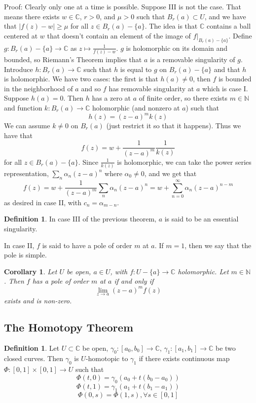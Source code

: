 \documentclass[11pt]{article}
\theoremstyle{plain}
\newtheorem{corollary}[theorem]{Corollary}
\theoremstyle{definition}
\newtheorem{definition}[theorem]{Definition}
\newcommand{\C}{\mathbb{C}}
\begin{document}
Proof: Clearly only one at a time is possible. Suppose III is not the case. That means there exists $w \in \C$, $r > 0$, and $\mu > 0$ such that $B_r(a) \subset U$, and we have that $|f(z)-w| \geq \mu$ for all $z \in B_r(a) - \{ a \}$. The idea is that $\C$ contains a ball centered at $w$ that doesn't contain an element of the image of $f|_{B_r(a) - \{ a\}}$. Define $g : B_r(a) - \{ a \} \to \C$ as $z \mapsto \frac{1}{f(z) - w}$. $g$ is holomorphic on its domain and bounded, so Riemann's Theorem implies that $a$ is a removable singularity of $g$. Introduce $h: B_r(a) \to \C$ such that $h$ is equal to $g$ on $B_r(a) - \{ a \}$ and that $h$ is holomorphic. We have two cases: the first is that $h(a) \neq  0$, then $f$ is bounded in the neighborhood of $a$ and so $f$ has removable singularity at $a$ which is case I. Suppose $h(a) = 0$. Then $h$ has a zero at $a$ of finite order, so there exists $m \in \mathbb{N}$ and function $k: B_r(a) \to \C$ holomorphic (and nonzero at $a$) such that 
$$ h(z) = (z - a)^mk(z) $$
We can assume $k \neq 0$ on $B_r(a)$ (just restrict it so that it happens). Thus we have that 
$$ f(z) = w + \frac{1}{(z-a)^m} \frac{1}{k(z)} $$
for all $z \in B_r(a) - \{ a\}$. Since $\frac{1}{k(z)}$ is holomorphic, we can take the power series representation, $\sum_{n} \alpha_n(z-a)^n$ where $\alpha_0 \neq 0$, and we get that 
$$ f(z) = w + \frac{1}{(z-a)^m}\sum_n \alpha_n (z-a)^n = w + \sum_{n=0}^{\infty}\alpha_n (z-a)^{n-m} $$
as desired in case II, with $c_n = \alpha_{m-n}$.

\begin{definition}
In case III of the previous theorem, $a$ is said to be an essential singularity. 

In case II, $f$ is said to have a pole of order $m$ at $a$. If $m = 1$, then we say that the pole is simple.
\end{definition}

\begin{corollary}
Let $U$ be open, $a \in U$, with $f:U - \{ a\} \to \C$ holomorphic. Let $m \in \mathbb{N}$. Then $f$ has a pole of order $m$ at $a$ if and only if 
$$ \lim_{z \to a} (z-a)^m f(z) $$
exists and is non-zero. 
\end{corollary}

\subsection{ The Homotopy Theorem}

\begin{definition}
Let $U \subset \C$ be open, $\gamma_0:[a_0,b_0] \to \C$, $\gamma_1:[a_1,b_1] \to \C$ be two closed curves. Then $\gamma_0$ is $U$-homotopic to $\gamma_1$ if there exists continuous map $\Phi : [0,1]\times[0,1]\to U$ such that 
$$ \Phi(t, 0) = \gamma_0(a_0 + t(b_0 - a_0)) $$
$$\Phi(t, 1) = \gamma_1(a_1 + t(b_1 - a_1)) $$
$$\Phi(0, s) = \Phi(1, s), \forall s \in [0,1]$$
\end{definition}
\end{document}
